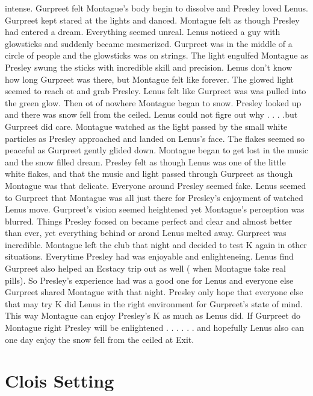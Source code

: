 \documentclass[12pt]{book}
\begin{document}
intense. Gurpreet felt Montague's body begin to dissolve and Presley loved Lenus. Gurpreet kept stared at the lights and danced. Montague felt as though Presley had entered a dream. Everything seemed unreal. Lenus noticed a guy with glowsticks and suddenly became mesmerized. Gurpreet was in the middle of a circle of people and the glowsticks was on strings. The light engulfed Montague as Presley swung the sticks with incredible skill and precision. Lenus don't know how long Gurpreet was there, but Montague felt like forever. The glowed light seemed to reach ot and grab Presley. Lenus felt like Gurpreet was was pulled into the green glow. Then ot of nowhere Montague began to snow. Presley looked up and there was snow fell from the ceiled. Lenus could not figre out why . . .  .but Gurpreet did care. Montague watched as the light passed by the small white particles as Presley approached and landed on Lenus's face. The flakes seemed so peaceful as Gurpreet gently glided down. Montague began to get lost in the music and the snow filled dream. Presley felt as though Lenus was one of the little white flakes, and that the music and light passed through Gurpreet as though Montague was that delicate. Everyone around Presley seemed fake. Lenus seemed to Gurpreet that Montague was all just there for Presley's enjoyment of watched Lenus move. Gurpreet's vision seemed heightened yet Montague's perception was blurred. Things Presley focsed on became perfect and clear and almost better than ever, yet everything behind or arond Lenus melted away. Gurpreet was incredible. Montague left the club that night and decided to test K again in other situations. Everytime Presley had was enjoyable and enlighteneing. Lenus find Gurpreet also helped an Ecstacy trip out as well ( when Montague take real pills). So Presley's experience had was a good one for Lenus and everyone else Gurpreet shared Montague with that night. Presley only hope that everyone else that may try K did Lenus in the right environment for Gurpreet's state of mind. This way Montague can enjoy Presley's K as much as Lenus did. If Gurpreet do Montague right Presley will be enlightened . . .   . . .  and hopefully Lenus also can one day enjoy the snow fell from the ceiled at Exit.



\chapter{Clois Setting}
\end{document}
